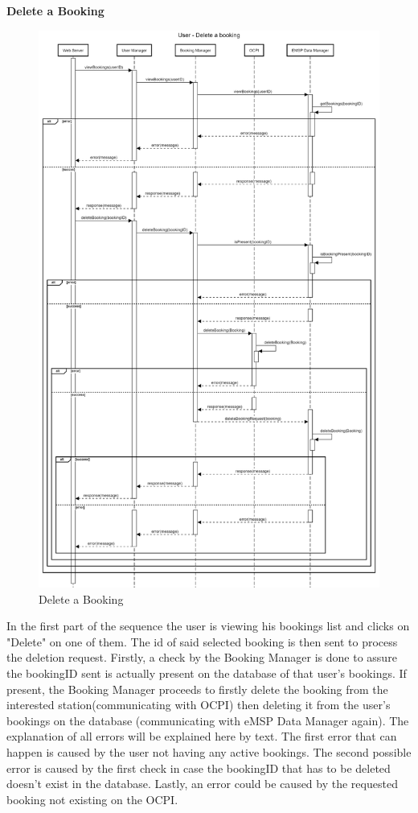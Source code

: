 \documentclass[table, 12pt]{article}
\begin{document}
\textbf{Delete a Booking}
\newpage
\begin{center}
    \begin{figure}[H]
        \includegraphics[scale=0.15, center]{assets/sequenceDiagrams/User delete bookings.png}
        \caption{Delete a Booking}
        \label{Delete Booking}
    \end{figure}
\end{center}
In the first part of the sequence the user is viewing his bookings list and clicks on "Delete" on one of them. The id of said selected booking is then sent to process the deletion request.
Firstly, a check by the Booking Manager is done to assure the bookingID sent is actually present on the database of that user's bookings. If present, the Booking Manager proceeds to firstly delete the booking from the 
interested station(communicating with OCPI) then deleting it from the user's bookings on the database (communicating with eMSP Data Manager again).
 The explanation of all errors will be explained here by text. The first error that can happen is caused by the user not having any active bookings.
 The second possible error is caused by the first check in case the bookingID that has to be deleted doesn't exist in the database.
 Lastly, an error could be caused by the requested booking not existing on the OCPI. 
\end{document}
